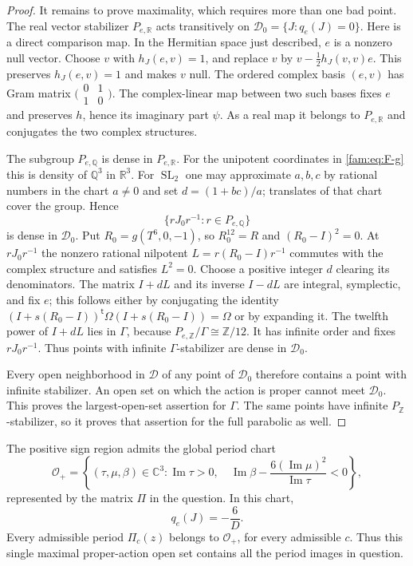 \begin{proof}
It remains to prove maximality, which requires more than one bad point.
The real vector stabilizer $P_{e,\mathbb R}$ acts transitively on
$\mathcal D_0=\{J:q_e(J)=0\}$.  Here is a direct comparison map.  In the
Hermitian space just described, $e$ is a nonzero null vector.  Choose
$v$ with $h_J(e,v)=1$, and replace $v$ by
$v-\tfrac12h_J(v,v)e$.  This preserves $h_J(e,v)=1$ and makes $v$ null.
The ordered complex basis $(e,v)$ has Gram matrix
$\bigl(\begin{smallmatrix}0&1\\1&0\end{smallmatrix}\bigr)$.
The complex-linear map between two such bases fixes $e$ and preserves
$h$, hence its imaginary part $\psi$.  As a real map it belongs to
$P_{e,\mathbb R}$ and conjugates the two complex structures.

The subgroup $P_{e,\mathbb Q}$ is dense in $P_{e,\mathbb R}$.
For the unipotent coordinates in \eqref{fam:eq:F-g} this is density of
$\mathbb Q^3$ in $\mathbb R^3$.  For $\operatorname{SL}_2$ one may
approximate $a,b,c$ by rational numbers in the chart $a\ne0$ and set
$d=(1+bc)/a$; translates of that chart cover the group.  Hence
\[
 \{rJ_0r^{-1}:r\in P_{e,\mathbb Q}\}
\]
is dense in $\mathcal D_0$.
Put $R_0=g(T^6,0,-1)$, so $R_0^{12}=R$ and
$(R_0-I)^2=0$.  At $rJ_0r^{-1}$ the nonzero rational nilpotent
$L=r(R_0-I)r^{-1}$ commutes with the complex structure and satisfies
$L^2=0$.  Choose a positive integer $d$ clearing its denominators.
The matrix $I+dL$ and its inverse $I-dL$ are integral, symplectic, and
fix $e$; this follows either by conjugating the identity
$(I+s(R_0-I))^{\mathsf t}\Omega(I+s(R_0-I))=\Omega$ or by expanding it.
The twelfth power of $I+dL$ lies in $\Gamma$, because
$P_{e,\mathbb Z}/\Gamma\cong\mathbb Z/12$.  It has infinite order and
fixes $rJ_0r^{-1}$.  Thus points with infinite $\Gamma$-stabilizer are
dense in $\mathcal D_0$.

Every open neighborhood in $\mathcal D$ of any point of $\mathcal D_0$
therefore contains a point with infinite stabilizer.  An open set on
which the action is proper cannot meet $\mathcal D_0$.  This proves the
largest-open-set assertion for $\Gamma$.  The same points have infinite
$P_{\mathbb Z}$-stabilizer, so it proves that assertion for the full
parabolic as well.
\end{proof}

\begin{proposition}\label{fam:src:F.2.3}\label{fam:st:F.2.3}
The positive sign region admits the global period chart
\[
 \mathcal O_+=\left\{
 (\tau,\mu,\beta)\in\mathbb C^3:
 \operatorname{Im}\tau>0,\quad
 \operatorname{Im}\beta-\frac{6(\operatorname{Im}\mu)^2}
 {\operatorname{Im}\tau}<0\right\},
\]
represented by the matrix $\Pi$ in the question.  In this chart,
\begin{equation}\label{fam:eq:F-qD}
 q_e(J)=-\frac6D.
\end{equation}
Every admissible period $\Pi_c(z)$ belongs to $\mathcal O_+$, for every
admissible $c$.  Thus this single maximal proper-action open set contains
all the period images in question.
\end{proposition}


